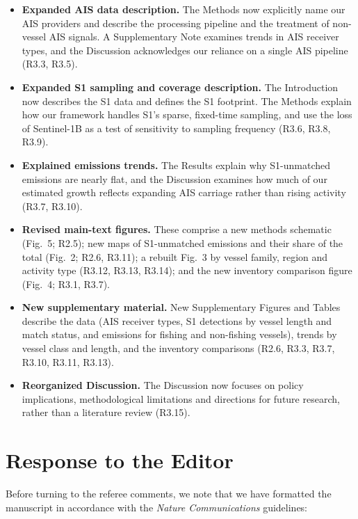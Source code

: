 \documentclass[11pt]{article}
\newcommand{\reviewer}[1]{\bigskip\section*{#1}}
\begin{document}
\begin{itemize}[leftmargin=*, itemsep=2pt]
  \item \textbf{Expanded AIS data description.} The Methods now explicitly name our AIS providers and describe the processing pipeline and the treatment of non-vessel AIS signals. A Supplementary Note examines trends in AIS receiver types, and the Discussion acknowledges our reliance on a single AIS pipeline (R3.3, R3.5).
  \item \textbf{Expanded S1 sampling and coverage description.} The Introduction now describes the S1 data and defines the S1 footprint. The Methods explain how our framework handles S1's sparse, fixed-time sampling, and use the loss of Sentinel-1B as a test of sensitivity to sampling frequency (R3.6, R3.8, R3.9).
  \item \textbf{Explained emissions trends.} The Results explain why S1-unmatched emissions are nearly flat, and the Discussion examines how much of our estimated growth reflects expanding AIS carriage rather than rising activity (R3.7, R3.10).
  \item \textbf{Revised main-text figures.} These comprise a new methods schematic (Fig.~5; R2.5); new maps of S1-unmatched emissions and their share of the total (Fig.~2; R2.6, R3.11); a rebuilt Fig.~3 by vessel family, region and activity type (R3.12, R3.13, R3.14); and the new inventory comparison figure (Fig.~4; R3.1, R3.7).
  \item \textbf{New supplementary material.} New Supplementary Figures and Tables describe the data (AIS receiver types, S1 detections by vessel length and match status, and emissions for fishing and non-fishing vessels), trends by vessel class and length, and the inventory comparisons (R2.6, R3.3, R3.7, R3.10, R3.11, R3.13).
  \item \textbf{Reorganized Discussion.} The Discussion now focuses on policy implications, methodological limitations and directions for future research, rather than a literature review (R3.15).
\end{itemize}

\reviewer{Response to the Editor}

Before turning to the referee comments, we note that we have formatted the manuscript in accordance with the \textit{Nature Communications} guidelines:
\end{document}
